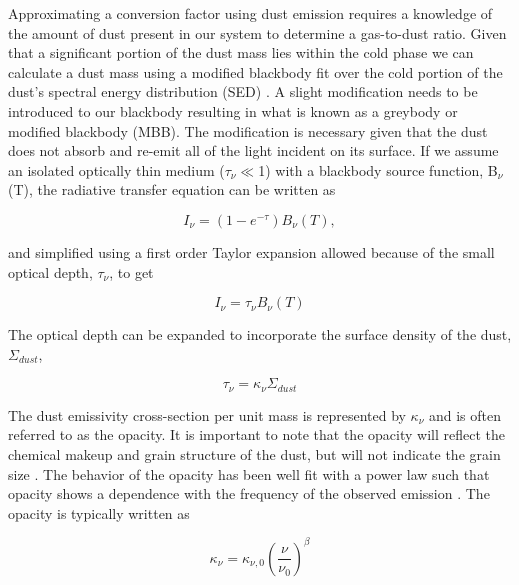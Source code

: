 Approximating a conversion factor using dust emission requires a knowledge of the amount of dust present in our system to determine a gas-to-dust ratio.  Given that a significant portion of the dust mass lies within the cold phase we can calculate a dust mass using a modified blackbody fit over the cold portion of the dust's spectral energy distribution (SED) \citep{galametz2012}.  A slight modification needs to be introduced to our blackbody resulting in what is known as a greybody or modified blackbody (MBB).  The modification is necessary given that the dust does not absorb and re-emit all of the light incident on its surface.  If we assume an isolated optically thin medium ($\tau_\nu \ll$1) with a blackbody source function, B$_\nu$(T), the radiative transfer equation can be written as 

\begin{equation}\label{eq:mbb_rad_t}
  I_\nu = \left(1-e^{-\tau}\right)B_\nu\left(T\right),
\end{equation}

\noindent and simplified using a first order Taylor expansion allowed because of the small optical depth, $\tau_\nu$,  to get

\begin{equation}\label{eq:mbb_optd}
  I_\nu = \tau_\nu B_\nu\left(T\right)
\end{equation}

\noindent The optical depth can be expanded to incorporate the surface density of the dust, $\Sigma_{dust}$,

\begin{equation}\label{eq:mbb_optd}
  \tau_\nu = \kappa_\nu \Sigma_{dust}
\end{equation}

\noindent The dust emissivity cross-section per unit mass is represented by $\kappa_\nu$ and is often referred to as the opacity.  It is important to note that the opacity will reflect the chemical makeup and grain structure of the dust, but will not indicate the grain size \citep{planckXI2013}.  The behavior of the opacity has been well fit with a power law such that opacity shows a dependence with the frequency of the observed emission \citep{hildebrand1983}.  The opacity is typically written as 

\begin{equation}\label{eq:mbb_kapp}
  \kappa_\nu = \kappa_{\nu,0}\left(\frac{\nu}{\nu_0}\right)^\beta
\end{equation}

